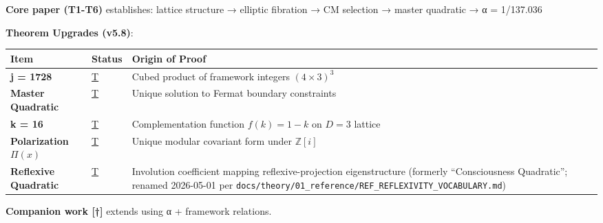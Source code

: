 \documentclass[
  11pt,
  letterpaper,
  twoside,
  openany]{book}
\begin{document}
\begin{tcolorbox}[enhanced jigsaw, colbacktitle=quarto-callout-warning-color!10!white, titlerule=0mm, bottomtitle=1mm, bottomrule=.15mm, colback=white, arc=.35mm, breakable, toprule=.15mm, title=\textcolor{quarto-callout-warning-color}{\faExclamationTriangle}\hspace{0.5em}{Core Paper vs.~Companion Work}, rightrule=.15mm, coltitle=black, leftrule=.75mm, colframe=quarto-callout-warning-color-frame, toptitle=1mm, opacityback=0, opacitybacktitle=0.6, left=2mm]

\textbf{Core paper (T1-T6)} establishes: lattice structure → elliptic
fibration → CM selection → master quadratic → α = 1/137.036

\textbf{Theorem Upgrades (v5.8)}:

\begin{longtable}[]{@{}
  >{\raggedright\arraybackslash}p{}
  >{\raggedright\arraybackslash}p{}
  >{\raggedright\arraybackslash}p{}@{}}
\toprule\noalign{}
\begin{minipage}[b]{\linewidth}\raggedright
Item
\end{minipage} & \begin{minipage}[b]{\linewidth}\raggedright
Status
\end{minipage} & \begin{minipage}[b]{\linewidth}\raggedright
Origin of Proof
\end{minipage} \\
\midrule\noalign{}
\endhead
\bottomrule\noalign{}
\endlastfoot
\textbf{j = 1728} & \hyperref[t]{T} & Cubed product of framework
integers \((4 \times 3)^3\) \\
\textbf{Master Quadratic} & \hyperref[t]{T} & Unique solution to Fermat
boundary constraints \\
\textbf{k = 16} & \hyperref[t]{T} & Complementation function
\(f(k)=1-k\) on \(D=3\) lattice \\
\textbf{Polarization \(\Pi(x)\)} & \hyperref[t]{T} & Unique modular
covariant form under \(\mathbb{Z}[i]\) \\
\textbf{Reflexive Quadratic} & \hyperref[t]{T} & Involution coefficient
mapping reflexive-projection eigenstructure (formerly ``Consciousness
Quadratic''; renamed 2026-05-01 per
\texttt{docs/theory/01\_reference/REF\_REFLEXIVITY\_VOCABULARY.md}) \\
\end{longtable}

\textbf{Companion work {[}†{]}} extends using α + framework relations.

\end{tcolorbox}
\end{document}

